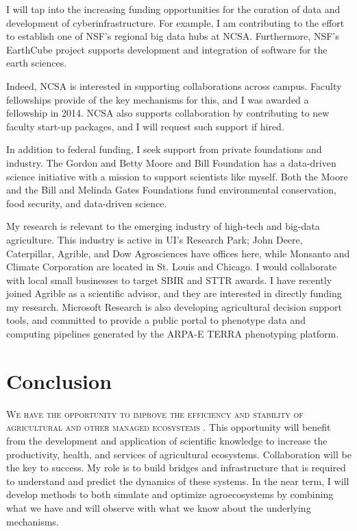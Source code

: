 \documentclass[english]{tufte-handout}
\providecommand\mynewthought[1]{%
   \addvspace{0.5em}%
   \noindent\hspace{-0.5em}\textsc{#1} %
}
\begin{document}
\begin{fullwidth}
 I will tap into the increasing funding opportunities for the curation of data and development of cyberinfrastructure.
 For example, I am contributing to the effort to establish one of NSF's regional big data hubs at NCSA.
 Furthermore, NSF's EarthCube project supports development and integration of software for the earth sciences.

 Indeed, NCSA is interested in supporting collaborations across campus.
 Faculty fellowships provide of the key mechanisms for this, and I was awarded a fellowship in 2014.
 NCSA also supports collaboration by contributing to new faculty start-up packages, and I will request such support if hired.

 In addition to federal funding, I seek support from private foundations and industry. 
 The Gordon and Betty Moore and Bill Foundation has a data-driven science initiative with a mission to support scientists like myself.
 Both the Moore and the Bill and Melinda Gates Foundations fund environmental conservation, food security, and data-driven science.

 My research is relevant to the emerging industry of high-tech and big-data agriculture.
 This industry is active in UI's Research Park; John Deere, Caterpillar, Agrible, and Dow Agrosciences have offices here, while Monsanto and Climate Corporation are located in St. Louis and Chicago. 
 I would collaborate with local small businesses to target SBIR and STTR awards. I have recently joined Agrible as a scientific advisor, and they are interested in directly funding my research.
 Microsoft Research is also developing agricultural decision support tools, and committed to provide a public portal to phenotype data and computing pipelines generated by the ARPA-E TERRA phenotyping platform.

\section{Conclusion}

\mynewthought{We have the opportunity to improve the efficiency and stability of agricultural and other managed ecosystems}.
 This opportunity will benefit from the development and application of scientific knowledge to increase the productivity, health, and services of agricultural ecosystems.
  Collaboration will be the key to success. 
  My role is to build bridges and infrastructure that is required to understand and predict the dynamics of these systems.
 In the near term, I will develop methods to both simulate and optimize agroecosystems by combining what we have and will observe with what we know about the underlying mechanisms. 


\end{fullwidth}
\end{document}
